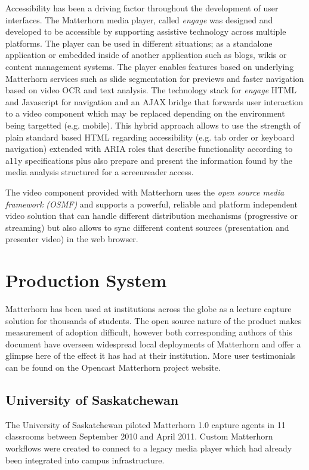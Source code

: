 \documentclass{sig-alternate}
\begin{document}
Accessibility has been a driving factor throughout the development of user interfaces. The Matterhorn media player, called \emph{engage} was designed and developed to be accessible by supporting assistive technology across multiple platforms. The player can be used in different situations; as a standalone application or embedded inside of another application such as blogs, wikis or content management systems. The player enables features based on underlying Matterhorn services such as slide segmentation for previews and faster navigation based on video OCR and text analysis. The technology stack for \emph{engage} HTML and Javascript for navigation and an AJAX bridge that forwards user interaction to a video component which may be replaced depending on the environment being targetted (e.g. mobile). This hybrid approach allows to use the strength of plain standard based HTML regarding accessibility (e.g. tab order or keyboard navigation) extended with ARIA roles that describe functionality according to a11y specifications plus also prepare and present the information found by the media analysis structured for a screenreader access. 

The video component provided with Matterhorn uses the \emph{open source media framework (OSMF)} and supports a powerful, reliable and platform independent video solution that can handle different distribution mechanisms (progressive or streaming) but also allows to sync different content sources (presentation and presenter video) in the web browser.

\section{Production System}
Matterhorn has been used at institutions across the globe as a lecture capture solution for thousands of students.  The open source nature of the product makes measurement of adoption difficult, however both corresponding authors of this document have overseen widespread local deployments of Matterhorn and offer a glimpse here of the effect it has had at their institution.  More user testimonials can be found on the Opencast Matterhorn project website.

\subsection{University of Saskatchewan}
The University of Saskatchewan piloted Matterhorn 1.0 capture agents in 11 classrooms between September 2010 and April 2011.  Custom Matterhorn workflows were created to connect to a legacy media player which had already been integrated into campus infrastructure.
\end{document}
